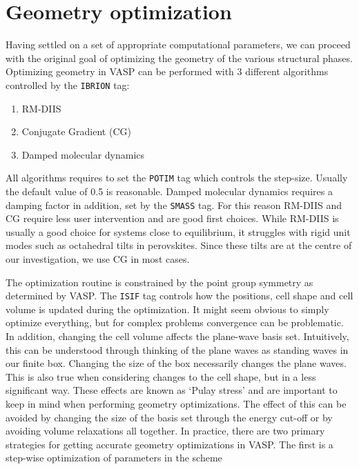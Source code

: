 \section{Geometry optimization}\label{sec:sim_geomopt}
Having settled on a set of appropriate computational parameters, we can proceed with the original goal of optimizing the geometry of the various structural phases. Optimizing geometry in VASP can be performed with 3 different algorithms controlled by the \texttt{IBRION} tag:

\begin{enumerate}
	\item RM-DIIS
	\item Conjugate Gradient (CG)
	\item Damped molecular dynamics
\end{enumerate}

\noindent All algorithms requires to set the \texttt{POTIM} tag which controls the step-size. Usually the default value of 0.5 is reasonable. Damped molecular dynamics requires a damping factor in addition, set by the \texttt{SMASS} tag. For this reason RM-DIIS and CG require less user intervention and are good first choices. While RM-DIIS is usually a good choice for systems close to equilibrium, it struggles with rigid unit modes such as octahedral tilts in perovskites. Since these tilts are at the centre of our investigation, we use CG in most cases.

The optimization routine is constrained by the point group symmetry as determined by VASP. The \texttt{ISIF} tag controls how the positions, cell shape and cell volume is updated during the optimization. It might seem obvious to simply optimize everything, but for complex problems convergence can be problematic. In addition, changing the cell volume affects the plane-wave basis set. Intuitively, this can be understood through thinking of the plane waves as standing waves in our finite box. Changing the size of the box necessarily changes the plane waves. This is also true when considering changes to the cell shape, but in a less significant way. These effects are known as `Pulay stress' \cite{zotero-1453} and are important to keep in mind when performing geometry optimizations. The effect of this can be avoided by changing the size of the basis set through the energy cut-off or by avoiding volume relaxations all together. In practice, there are two primary strategies for getting accurate geometry optimizations in VASP. The first is a step-wise optimization of parameters in the scheme

